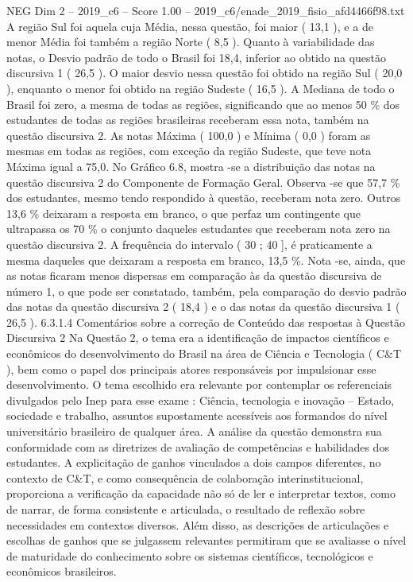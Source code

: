 \begin{textsample}{NEG Dim 2 – 2019\_c6 – Score 1.00 – 2019\_c6/enade\_2019\_fisio\_afd4466f98.txt}
A região Sul foi aquela cuja Média, nessa questão, foi maior ( 13,1 ), e a de menor Média foi também a região Norte ( 8,5 ).
Quanto à variabilidade das notas, o Desvio padrão de todo o Brasil foi 18,4, inferior ao obtido na questão discursiva 1 ( 26,5 ).
O maior desvio nessa questão foi obtido na região Sul ( 20,0 ), enquanto o menor foi obtido na região Sudeste ( 16,5 ).
A Mediana de todo o Brasil foi zero, a mesma de todas as regiões, significando que ao menos 50 \% dos estudantes de todas as regiões brasileiras receberam essa nota, também na questão discursiva 2.
As notas Máxima ( 100,0 ) e Mínima ( 0,0 ) foram as mesmas em todas as regiões, com exceção da região Sudeste, que teve nota Máxima igual a 75,0.
No Gráfico 6.8, mostra -se a distribuição das notas na questão discursiva 2 do Componente de Formação Geral.
Observa -se que 57,7 \% dos estudantes, mesmo tendo respondido à questão, receberam nota zero.
Outros 13,6 \% deixaram a resposta em branco, o que perfaz um contingente que ultrapassa os 70 \% o conjunto daqueles estudantes que receberam nota zero na questão discursiva 2.
A frequência do intervalo ( 30 ; 40 ], é praticamente a mesma daqueles que deixaram a resposta em branco, 13,5 \%.
Nota -se, ainda, que as notas ficaram menos dispersas em comparação às da questão discursiva de número 1, o que pode ser constatado, também, pela comparação do desvio padrão das notas da questão discursiva 2 ( 18,4 ) e o das notas da questão discursiva 1 ( 26,5 ). 6.3.1.4 Comentários sobre a correção de Conteúdo das respostas à Questão Discursiva 2 Na Questão 2, o tema era a identificação de impactos científicos e econômicos do desenvolvimento do Brasil na área de Ciência e Tecnologia ( C\&T ), bem como o papel dos principais atores responsáveis por impulsionar esse desenvolvimento.
O tema escolhido era relevante por contemplar os referenciais divulgados pelo Inep para esse exame : Ciência, tecnologia e inovação – Estado, sociedade e trabalho, assuntos supostamente acessíveis aos formandos do nível universitário brasileiro de qualquer área.
A análise da questão demonstra sua conformidade com as diretrizes de avaliação de competências e habilidades dos estudantes.
A explicitação de ganhos vinculados a dois campos diferentes, no contexto de C\&T, e como consequência de colaboração interinstitucional, proporciona a verificação da capacidade não só de ler e interpretar textos, como de narrar, de forma consistente e articulada, o resultado de reflexão sobre necessidades em contextos diversos.
Além disso, as descrições de articulações e escolhas de ganhos que se julgassem relevantes permitiram que se avaliasse o nível de maturidade do conhecimento sobre os sistemas científicos, tecnológicos e econômicos brasileiros.

\end{textsample}
